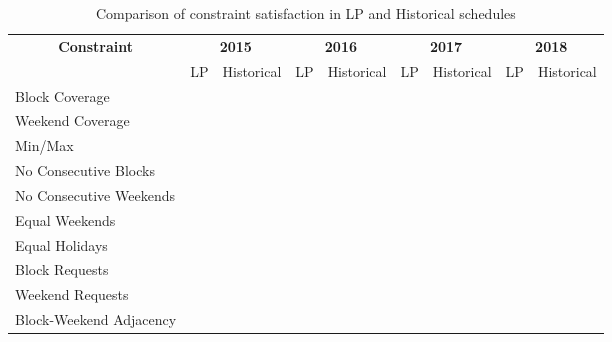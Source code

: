 \begin{table}[h]
	\centering
    \begin{tabular}{l|cc|cc|cc|cc}
    	\hline
    	\multicolumn{1}{c|}{\multirow{2}[1]{*}{\textbf{Constraint}}} & \multicolumn{2}{c|}{\textbf{2015}} & \multicolumn{2}{c|}{\textbf{2016}} & \multicolumn{2}{c|}{\textbf{2017}} & \multicolumn{2}{c}{\textbf{2018}} \\
    	                                                    & LP &      Historical      & LP &      Historical      & LP &      Historical      & LP &     Historical      \\ \midrule
    	Block Coverage                                      & \checkmark  &                      & \checkmark  &                      & \checkmark  &          \checkmark           & \checkmark  &          \checkmark          \\
    	Weekend Coverage                                    & \checkmark  &                      & \checkmark  &                      & \checkmark  &          \checkmark           & \checkmark  &          \checkmark          \\
    	Min/Max                                             & \checkmark  &                      & \checkmark  &                      & \checkmark  &          \checkmark           & \checkmark  &          \checkmark          \\
    	No Consecutive Blocks                               & \checkmark  &                      & \checkmark  &                      & \checkmark  &                      & \checkmark  &                     \\
    	No Consecutive Weekends                             & \checkmark  &                      & \checkmark  &                      & \checkmark  &          \checkmark           & \checkmark  &          \checkmark          \\
    	Equal Weekends                                      & \checkmark  &                      & \checkmark  &                      & \checkmark  &                      & \checkmark  &                     \\
    	Equal Holidays                                      & \checkmark  &                      & \checkmark  &                      & \checkmark  &                      & \checkmark  &                     \\
    	\hline
    	Block Requests                                      &    &                      &    &                      &    &                      &    &                     \\
    	Weekend Requests                                    &    &                      &    &                      &    &                      &    &                     \\
    	Block-Weekend Adjacency                             &    &                      &    &                      &    &                      &    &
    \end{tabular}%
	\caption{Comparison of constraint satisfaction in LP and Historical schedules}
	\label{tbl:constraints-comparison}%
\end{table}%
